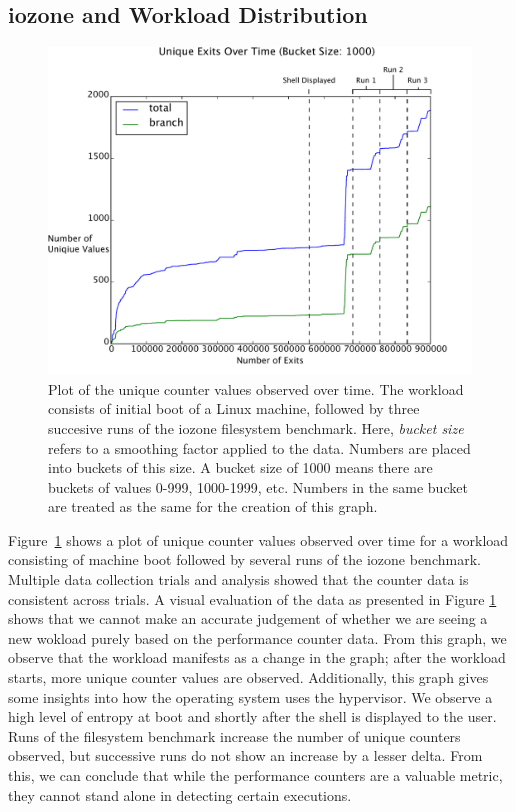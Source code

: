 \documentclass[notitlepage]{article}
\begin{document}
\subsection{iozone and Workload Distribution}
\begin{figure}[htp]
    \centering
    \includegraphics[width=4.5in]{iozone_plot.pdf}
    \caption{Plot of the unique counter values observed over time. The workload
    consists of initial boot of a Linux machine, followed by three succesive
runs of the iozone filesystem benchmark. Here, \textit{bucket size} refers to
a smoothing factor applied to the data. Numbers are placed into buckets of this
size. A bucket size of 1000 means there are buckets of values 0-999, 1000-1999,
etc. Numbers in the same bucket are treated as the same for the creation of this
graph.}
    \label{fig:iozoneplot}
\end{figure}

Figure~\ref{fig:iozoneplot} shows a plot of unique counter values observed over
time for a workload consisting of machine boot followed by several runs of the
iozone benchmark. Multiple data collection trials and analysis showed that the
counter data is consistent across trials. A visual evaluation of the data as
presented in Figure \ref{fig:iozoneplot} shows that we cannot make an accurate
judgement of whether we are seeing a new wokload purely based on the performance
counter data. From this graph, we observe that the workload manifests as a
change in the graph; after the workload starts, more unique counter values are
observed.  Additionally, this graph gives some insights into how the operating
system uses the hypervisor. We observe a high level of entropy at boot and
shortly after the shell is displayed to the user. Runs of the filesystem
benchmark increase the number of unique counters observed, but successive runs
do not show an increase by a lesser delta. From this, we can conclude that while
the performance counters are a valuable metric, they cannot stand alone in
detecting certain executions.
\end{document}
